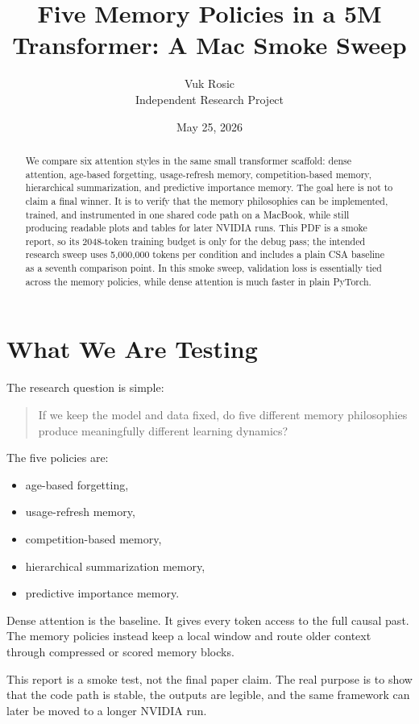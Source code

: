 \documentclass[10pt,twocolumn]{article}
\title{\vspace{-1.1em}\bfseries Five Memory Policies in a 5M Transformer: A Mac Smoke Sweep}
\author{Vuk Rosic\\\small Independent Research Project}
\date{May 25, 2026}
\begin{document}
\maketitle

\begin{abstract}
We compare six attention styles in the same small transformer scaffold:
dense attention, age-based forgetting, usage-refresh memory, competition-based
memory, hierarchical summarization, and predictive importance memory. The goal
here is not to claim a final winner. It is to verify that the memory
philosophies can be implemented, trained, and instrumented in one shared code
path on a MacBook, while still producing readable plots and tables for later
NVIDIA runs. This PDF is a smoke report, so its 2048-token training budget is
only for the debug pass; the intended research sweep uses 5,000,000 tokens per
condition and includes a plain CSA baseline as a seventh comparison point.
In this smoke sweep, validation loss is essentially tied across the memory
policies, while dense attention is much faster in plain PyTorch.
\end{abstract}

\section{What We Are Testing}

The research question is simple:

\begin{quote}
If we keep the model and data fixed, do five different memory philosophies
produce meaningfully different learning dynamics?
\end{quote}

The five policies are:

\begin{itemize}
\item age-based forgetting,
\item usage-refresh memory,
\item competition-based memory,
\item hierarchical summarization memory,
\item predictive importance memory.
\end{itemize}

Dense attention is the baseline. It gives every token access to the full causal
past. The memory policies instead keep a local window and route older context
through compressed or scored memory blocks.

This report is a smoke test, not the final paper claim. The real purpose is to
show that the code path is stable, the outputs are legible, and the same
framework can later be moved to a longer NVIDIA run.
\end{document}
